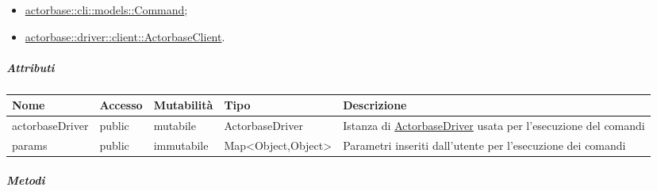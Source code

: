 \documentclass{scalatekids-article}
\begin{document}
\begin{itemize}
\item \hyperref[sec:actorbase::cli::models::Command]{actorbase::cli::models::Command};
\item \hyperref[sec:actorbase::driver::client::ActorbaseClient]{actorbase::driver::client::ActorbaseClient}.
\end{itemize}

\subparagraph{Attributi}
\begin{tabular}{| p{2.5cm} | p{1.5cm} | p{2cm} | p{2.5cm} | p{8.5cm} |}
  \hline
  Nome & Accesso & Mutabilità & Tipo & Descrizione\\
  \hline
  actorbaseDriver & public & mutabile & ActorbaseDriver & Istanza di \hyperref[sec:actorbase::driver::]{ActorbaseDriver} usata per l'esecuzione del comandi\\
  \hline
  params & public & immutabile & Map<Object,Object> & Parametri inseriti dall'utente per l'esecuzione dei comandi\\
  \hline
\end{tabular}

\subparagraph{Metodi}
\end{document}
